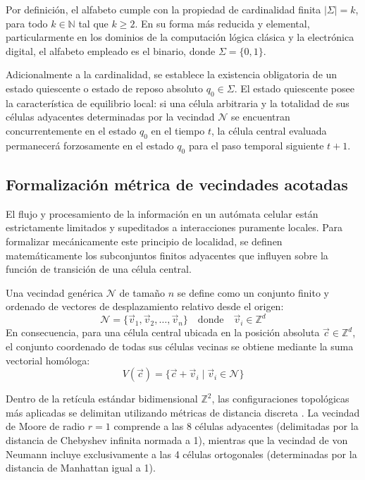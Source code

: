 Por definición, el alfabeto cumple con la propiedad de cardinalidad finita $|\Sigma| = k$, para todo $k \in \mathbb{N}$ tal que $k \geq 2$. En su forma más reducida y elemental, particularmente en los dominios de la computación lógica clásica y la electrónica digital, el alfabeto empleado es el binario, donde $\Sigma = \{0, 1\}$. 

Adicionalmente a la cardinalidad, se establece la existencia obligatoria de un estado quiescente o estado de reposo absoluto $q_0 \in \Sigma$. El estado quiescente posee la característica de equilibrio local: si una célula arbitraria y la totalidad de sus células adyacentes determinadas por la vecindad $\mathcal{N}$ se encuentran concurrentemente en el estado $q_0$ en el tiempo $t$, la célula central evaluada permanecerá forzosamente en el estado $q_0$ para el paso temporal siguiente $t+1$.

\subsection{Formalización métrica de vecindades acotadas}
El flujo y procesamiento de la información en un autómata celular están estrictamente limitados y supeditados a interacciones puramente locales. Para formalizar mecánicamente este principio de localidad, se definen matemáticamente los subconjuntos finitos adyacentes que influyen sobre la función de transición de una célula central.

Una vecindad genérica $\mathcal{N}$ de tamaño $n$ se define como un conjunto finito y ordenado de vectores de desplazamiento relativo desde el origen:
\begin{equation}
    \mathcal{N} = \{\vec{v}_1, \vec{v}_2, \dots, \vec{v}_n\} \quad \text{donde} \quad \vec{v}_i \in \mathbb{Z}^d
\end{equation}
En consecuencia, para una célula central ubicada en la posición absoluta $\vec{c} \in \mathbb{Z}^d$, el conjunto coordenado de todas sus células vecinas se obtiene mediante la suma vectorial homóloga:
\begin{equation}
    V(\vec{c}) = \{\vec{c} + \vec{v}_i \mid \vec{v}_i \in \mathcal{N}\}
\end{equation}

Dentro de la retícula estándar bidimensional $\mathbb{Z}^2$, las configuraciones topológicas más aplicadas se delimitan utilizando métricas de distancia discreta \cite{Adamatzky1994}. La vecindad de Moore de radio $r=1$ comprende a las 8 células adyacentes (delimitadas por la distancia de Chebyshev infinita normada a 1), mientras que la vecindad de von Neumann incluye exclusivamente a las 4 células ortogonales (determinadas por la distancia de Manhattan igual a 1).

